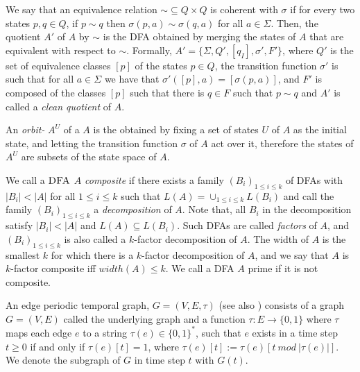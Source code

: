 We say that an equivalence relation $\sim \subseteq Q \times Q$ is coherent with $\sigma$ if for every two states $p, q \in Q$, if $p \sim q$ then $\sigma(p, a) \sim \sigma(q, a)$ for all $a \in \Sigma$. Then, the quotient $A'$ of $A$ by $\sim$ is the DFA obtained by merging the states of $A$ that are equivalent with respect to $\sim$. Formally, $A' = \{\Sigma, Q' , [q_I], \sigma' , F'\}$, where $Q'$ is the set of equivalence classes $[p]$ of the states $p \in Q$, the transition function $\sigma'$ is such that for all $a \in \Sigma$ we have that $\sigma' ([p], a) = [\sigma(p, a)]$, and $F'$ is composed of the classes $[p]$ such that there is $q \in F$ such that $p \sim q$ and $A'$ is called a \textit{clean quotient} of $A$.

An \textit{orbit-\DFA} $A^U$ of a \DFA $A$ is the \DFA obtained by fixing a set of states $U$ of $A$ as the initial state, and letting the transition function $\sigma$ of $A$ act over it, therefore the states of $A^U$ are subsets of the state space of $A$.

We call a $\textsc{DFA}$ $A$ \textit{composite} if there exists a family $(B_i)_{1 \leq i \leq k}$ of DFAs with $|B_i| < |A|$ for all $1 \leq i \leq k$ such that $L(A) = \cup_{1\leq i \leq k} L(B_i)$ and call the family $(B_i)_{1\leq i \leq k}$ a \textit{decomposition} of $A$. Note that, all $B_i$ in the decomposition satisfy $|B_i| < |A|$ and $L(A) \subseteq L(B_i)$. Such DFAs are called \textit{factors} of $A$, and $(B_i)_{1\leq i \leq k}$ is also called a $k$-factor decomposition of $A$. The
width of $A$ is the smallest $k$ for which there is a $k$-factor decomposition of $A$, and we say that $A$ is $k$-factor composite iff $width(A) \leq k$. We call a DFA $A$ prime if it is not composite.

An edge periodic temporal graph, $G = (V, E, \tau)$ (see also \cite{erlebach2020game}) consists of a graph $G = (V, E)$ called the underlying graph and a function $\tau : E \rightarrow \{0, 1\}$ where $\tau$ maps each edge $e$ to a string $\tau(e) \in \{0, 1\}^*$, such that $e$ exists in a time step $t \geq 0$ if and only if $\tau(e)[t] = 1$, where $\tau(e)[t] := \tau(e)[t~ mod~ |\tau(e)|]$. We denote the subgraph of $G$ in time step $t$ with $G(t)$.


